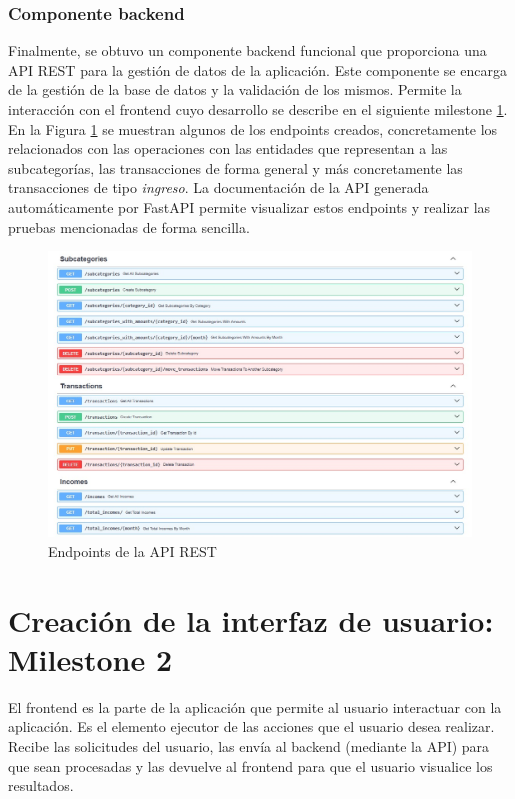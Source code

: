 \subsubsection{Componente backend}
Finalmente, se obtuvo un componente backend funcional que proporciona una API REST para la gestión de datos de la aplicación. Este componente se encarga de la gestión de la base de datos y la validación de los mismos. Permite la interacción con el frontend cuyo desarrollo se describe en el siguiente milestone \ref{cap:milestone2}. En la Figura \ref{fig:endpoints} se muestran algunos de los endpoints creados, concretamente los relacionados con las operaciones con las entidades que representan a las subcategorías, las transacciones de forma general y más concretamente las transacciones de tipo \textit{ingreso}. La documentación de la API generada automáticamente por FastAPI permite visualizar estos endpoints y realizar las pruebas mencionadas de forma sencilla.

\begin{figure}[ht!]
    \centering
    \includegraphics[width=\linewidth]{imagenes/endpoints.jpg}
    \caption{Endpoints de la API REST}
    \label{fig:endpoints}
\end{figure}


\section{Creación de la interfaz de usuario: Milestone 2}\label{cap:milestone2}
El frontend es la parte de la aplicación que permite al usuario interactuar con la aplicación. Es el elemento ejecutor de las acciones que el usuario desea realizar. Recibe las solicitudes del usuario, las envía al backend (mediante la API) para que sean procesadas y las devuelve al frontend para que el usuario visualice los resultados.

